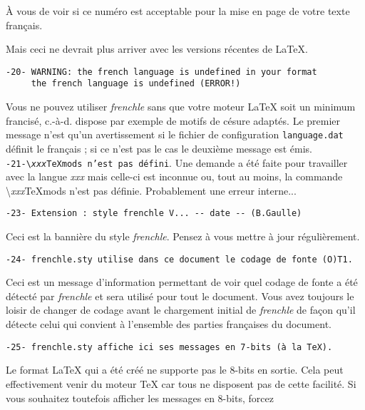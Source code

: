 \documentclass[a4paper,12pt,openright]{article}
\begin{document}
À vous de voir si ce numéro est acceptable pour la mise en page de votre
texte français.

Mais ceci ne devrait plus arriver avec les versions récentes de \LaTeX.\\
\begin{verbatim}
-20- WARNING: the french language is undefined in your format
     the french language is undefined (ERROR!)
\end{verbatim}
Vous ne pouvez utiliser \textit{frenchle} sans que votre moteur \LaTeX{} soit un minimum
francisé, c.-à-d. dispose par exemple de motifs de césure adaptés.
Le premier message n’est qu’un avertissement si le fichier de configuration
\texttt{language.dat} définit le français ; si ce n’est pas le cas le deuxième
message est émis.\\[2ex]
\texttt{-21-\backslash\textit{xxx}TeXmods n’est pas défini}.
Une demande a été faite pour travailler avec la langue \textit{xxx} mais celle-ci est
inconnue ou, tout au moins, la commande \backslash\textit{xxx}TeXmods n’est pas définie.
Probablement une erreur interne...\\
\begin{verbatim}
-23- Extension : style frenchle V... -- date -- (B.Gaulle)
\end{verbatim}
Ceci est la bannière du style \textit{frenchle}. Pensez à vous mettre à jour régulièrement.\\
\begin{verbatim}
-24- frenchle.sty utilise dans ce document le codage de fonte (O)T1.
\end{verbatim}
Ceci est un message d’information permettant de voir quel 
codage de
fonte a été détecté par \textit{frenchle} et sera utilisé pour tout le document.
Vous avez toujours le loisir de changer de codage avant le chargement
initial de \textit{frenchle} de façon qu’il détecte celui qui convient à l’ensemble
des parties françaises du document.\\
\begin{verbatim}
-25- frenchle.sty affiche ici ses messages en 7-bits (à la TeX).
\end{verbatim}
Le format \LaTeX{} qui a été créé ne supporte pas le 8-bits en sortie. Cela
peut effectivement venir du moteur \TeX{} car tous ne disposent pas de cette
facilité. Si vous souhaitez toutefois afficher les messages en 8-bits, forcez
\end{document}
